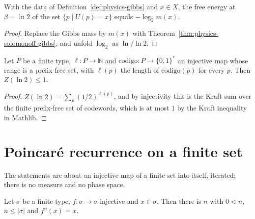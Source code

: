 \begin{theorem}[The free energy at $\beta = \ln 2$ is $-\log_2 m(x)$, in a finite model of programs]
  \label{thm:physics-energia-libre}
  \leanok
  With the data of Definition~\ref{def:physics-gibbs} and $x \in X$, the free energy at
  $\beta = \ln 2$ of the set $\{p \mid U(p) = x\}$ equals $-\log_2 m(x)$.
  \own{}
\end{theorem}

\begin{proof}
  \leanok
  Replace the Gibbs mass by $m(x)$ with Theorem~\ref{thm:physics-solomonoff-gibbs}, and unfold
  $\log_2$ as $\ln / \ln 2$.
\end{proof}

\begin{theorem}[Kraft: the partition function at $\beta = \ln 2$ is at most $1$ for prefix-free codes, in a finite model of programs]
  \label{thm:physics-kraft-z}
  \leanok
  Let $P$ be a finite type, $\ell : P \to \mathbb{N}$ and $\mathrm{codigo} : P \to \{0,1\}^{*}$ an
  injective map whose range is a prefix-free set, with $\ell(p)$ the length of
  $\mathrm{codigo}(p)$ for every $p$. Then $Z(\ln 2) \le 1$.
  \own{}
\end{theorem}

\begin{proof}
  \leanok
  $Z(\ln 2) = \sum_p (1/2)^{\ell(p)}$, and by injectivity this is the Kraft sum over the finite
  prefix-free set of codewords, which is at most $1$ by the Kraft inequality in Mathlib.
\end{proof}

\section{Poincar\'e recurrence on a finite set}
\label{sec:physics-poincare}

The statements are about an injective map of a finite set into itself, iterated; there is no
measure and no phase space.

\begin{theorem}
  \label{thm:physics-poincare}
  \leanok
  Let $\sigma$ be a finite type, $f : \sigma \to \sigma$ injective and $x \in \sigma$. Then there
  is $n$ with $0 < n$, $n \le |\sigma|$ and $f^{n}(x) = x$.
\end{theorem}

